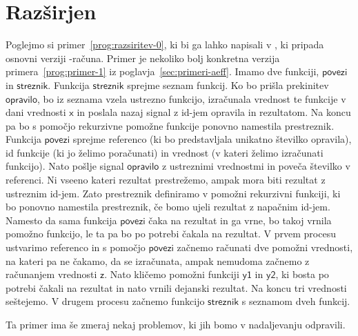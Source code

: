 \section{Razširjen \lae{}}\label{sec:razsirjen-lae}

Poglejmo si primer~\ref{prog:razsiritev-0}, ki bi ga lahko napisali v \aeff{}, ki pripada osnovni verziji \lae{}\nobreakdash-računa. Primer je nekoliko bolj konkretna verzija primera~\ref{prog:primer-1} iz poglavja~\ref{sec:primeri-aeff}. 
Imamo dve funkciji, $\mathsf{povezi}$ in $\mathsf{streznik}$.
Funkcija $\mathsf{streznik}$ sprejme seznam funkcij. Ko bo prišla prekinitev $\mathsf{opravilo}$, bo iz seznama vzela ustrezno funkcijo, izračunala vrednost te funkcije v dani vrednosti $\mathsf{x}$ in poslala nazaj signal z id-jem opravila in rezultatom. Na koncu pa bo s pomočjo rekurzivne pomožne funkcije ponovno namestila prestreznik.
Funkcija $\mathsf{povezi}$ sprejme referenco (ki bo predstavljala unikatno številko opravila), id funkcije (ki jo želimo poračunati) in vrednost (v kateri želimo izračunati funkcijo).
Nato pošlje signal $\mathsf{opravilo}$ z ustreznimi vrednostmi in poveča številko v referenci.
Ni vseeno kateri rezultat prestrežemo, ampak mora biti rezultat z ustreznim id-jem. Zato prestreznik definiramo v pomožni rekurzivni funkciji, ki bo ponovno namestila prestreznik, če bomo ujeli rezultat z napačnim id-jem.
Namesto da sama funkcija $\mathsf{povezi}$ čaka na rezultat in ga vrne, bo takoj vrnila pomožno funkcijo, le ta pa bo po potrebi čakala na rezultat.  
V prvem procesu ustvarimo referenco in s pomočjo $\mathsf{povezi}$ začnemo računati dve pomožni vrednosti, na kateri pa ne čakamo, da se izračunata, ampak nemudoma začnemo z računanjem vrednosti $\mathsf{z}$. Nato kličemo pomožni funkciji $\mathsf{y1}$ in $\mathsf{y2}$, ki bosta po potrebi čakali na rezultat in nato vrnili dejanski rezultat. Na koncu tri vrednosti seštejemo.
V drugem procesu začnemo funkcijo $\mathsf{streznik}$ s seznamom dveh funkcij.

Ta primer ima še zmeraj nekaj problemov, ki jih bomo v nadaljevanju odpravili.


